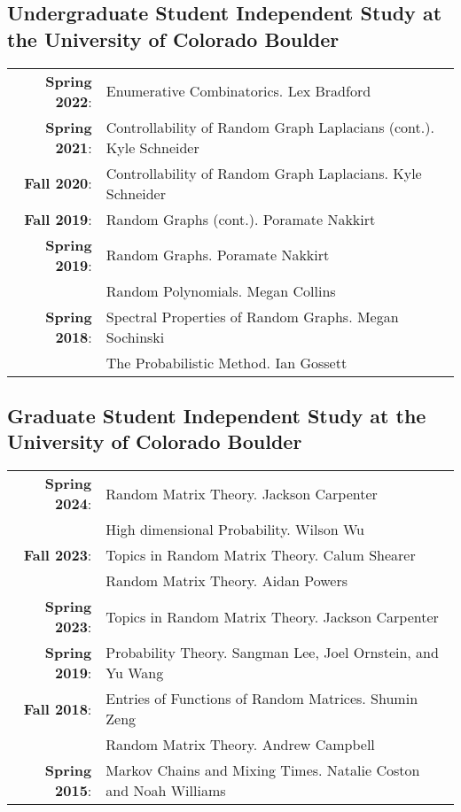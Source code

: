 \documentclass[letterpaper]{article}
\renewenvironment{itemize}{
  \begin{list}{}{
    \setlength{\leftmargin}{1em}
  }
}{
  \end{list}
}
\begin{document}
   \subsection*{Undergraduate Student Independent Study at the University of Colorado Boulder}
   \begin{tabular}{r l}
   	{\bf Spring 2022}: & Enumerative Combinatorics.  Lex Bradford \\
   	{\bf Spring 2021}: & Controllability of Random Graph Laplacians (cont.). Kyle Schneider \\
   	{\bf Fall 2020}: & Controllability of Random Graph Laplacians. Kyle Schneider \\
   	{\bf Fall 2019}: & Random Graphs (cont.).  Poramate Nakkirt \\
   	{\bf Spring 2019}: & Random Graphs.  Poramate Nakkirt  \\
   				& Random Polynomials.  Megan Collins \\
   	{\bf Spring 2018}: & Spectral Properties of Random Graphs.  Megan Sochinski \\
   				& The Probabilistic Method.  Ian Gossett
   \end{tabular}
   
   
   \subsection*{Graduate Student Independent Study at the University of Colorado Boulder}
   \begin{tabular}{r l}
   	{\bf Spring 2024}: & Random Matrix Theory. Jackson Carpenter  \\
			&High dimensional Probability. Wilson Wu \\
   	{\bf Fall 2023}: & Topics in Random Matrix Theory. Calum Shearer  \\
			& Random Matrix Theory. Aidan Powers \\
	{\bf Spring 2023}: & Topics in Random Matrix Theory. Jackson Carpenter  \\
   	{\bf Spring 2019}: & Probability Theory.  Sangman Lee, Joel Ornstein, and Yu Wang \\
   	{\bf Fall 2018}: & Entries of Functions of Random Matrices.  Shumin Zeng \\
   			& Random Matrix Theory.  Andrew Campbell \\
   	{\bf Spring 2015}: & Markov Chains and Mixing Times.  Natalie Coston and Noah Williams 
   \end{tabular} 
   
\end{document}
